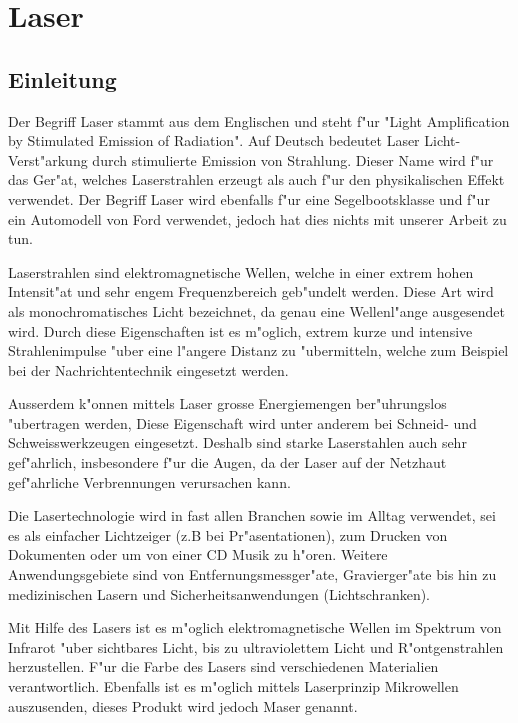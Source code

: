 \chapter{Laser\label{chapter:laser}}
\begin{refsection}


\section{Einleitung}

Der Begriff Laser stammt aus dem Englischen und steht f"ur 
"{}Light Amplification by Stimulated Emission of Radiation"{}.
Auf Deutsch bedeutet Laser Licht-Verst"arkung durch stimulierte Emission 
von Strahlung. Dieser Name wird f"ur das Ger"at, welches Laserstrahlen erzeugt 
als auch f"ur den physikalischen Effekt verwendet. Der Begriff Laser wird
ebenfalls f"ur eine Segelbootsklasse und f"ur ein Automodell von Ford
verwendet,
jedoch hat dies nichts mit unserer Arbeit zu tun.

Laserstrahlen sind elektromagnetische Wellen,
welche in einer extrem hohen Intensit"at und sehr engem
Frequenzbereich geb"undelt werden. Diese Art wird als monochromatisches
Licht bezeichnet, da genau eine Wellenl"ange ausgesendet wird. 
Durch diese Eigenschaften ist es m"oglich, extrem kurze und
intensive Strahlenimpulse "uber eine l"angere Distanz zu "ubermitteln,
welche zum Beispiel bei der Nachrichtentechnik eingesetzt werden.

Ausserdem k"onnen mittels Laser grosse Energiemengen ber"uhrungslos
"ubertragen werden, Diese Eigenschaft wird unter anderem bei Schneid-
und Schweisswerkzeugen eingesetzt. Deshalb sind starke Laserstahlen auch 
sehr gef"ahrlich, insbesondere f"ur die Augen, da der Laser auf der Netzhaut
gef"ahrliche Verbrennungen verursachen kann.

Die Lasertechnologie wird in fast allen Branchen sowie im Alltag verwendet, 
sei es als einfacher Lichtzeiger (z.B bei Pr"asentationen),
zum Drucken von Dokumenten oder um von einer CD Musik zu h"oren. 
Weitere Anwendungsgebiete sind von Entfernungsmessger"ate, 
Gravierger"ate bis hin zu medizinischen Lasern und Sicherheitsanwendungen
(Lichtschranken).

Mit Hilfe des Lasers ist es m"oglich elektromagnetische Wellen im Spektrum
von Infrarot "uber sichtbares Licht, bis zu ultraviolettem Licht und 
R"ontgenstrahlen herzustellen. F"ur die Farbe des Lasers sind 
verschiedenen Materialien verantwortlich. Ebenfalls ist es m"oglich mittels 
Laserprinzip Mikrowellen auszusenden, dieses Produkt wird jedoch Maser genannt.



\end{refsection}
